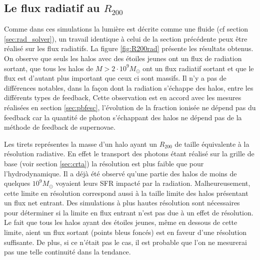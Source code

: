 \subsection{Le flux radiatif au $R_{200}$}
\label{sec:radflow}

Comme dans ces simulations la lumière est décrite comme une fluide (cf section \autoref{sec:rad_solver}), un travail identique à celui de la section précédente peux être réalisé sur les flux radiatifs.
La figure \ref{fig:R200rad} présente les résultats obtenus.
On observe que seuls les halos avec des étoiles jeunes ont un flux de radiation sortant, que tous les halos de $M>2 \cdot 10^9 M_\odot$ ont un flux radiatif sortant et que le flux est d'autant plus important que ceux ci sont massifs.
Il n'y a pas de différences notables, dans la façon dont la radiation s'échappe des halos, entre les différents types de feedback, 
Cette observation est en accord avec les mesures réalisées en section \ref{sec:pbfesc}, l'évolution de la fraction ionisée ne dépend pas du feedback car la quantité de photon s'échappant des halos ne dépend pas de la méthode de feedback de supernovae.

Les tirets représentes la masse d'un halo ayant un $R_{200}$ de taille équivalente à la résolution radiative.
En effet le transport des photons étant réalisé sur la grille de base (voir section \ref{sec:crta}) la résolution est plus faible que pour l'hydrodynamique.
Il a déjà été observé qu'une partie des halos de moins de quelques $10^9 M_\odot$ voyaient leurs \ac{SFR} impacté par la radiation. %
Malheureusement, cette limite en résolution correspond aussi à la taille limite des halos présentant un flux net entrant.
Des simulations à plus hautes résolution sont nécessaires pour déterminer si la limite en flux entrant n'est pas due à un effet de résolution.
Le fait que tous les halos ayant des étoiles jeunes, même en dessous de cette limite, aient un flux sortant (points bleus foncés) est en faveur d'une résolution suffisante. 
De plus, si ce n'était pas le cas, il est probable que l'on ne mesurerai pas une telle continuité dans la tendance.

